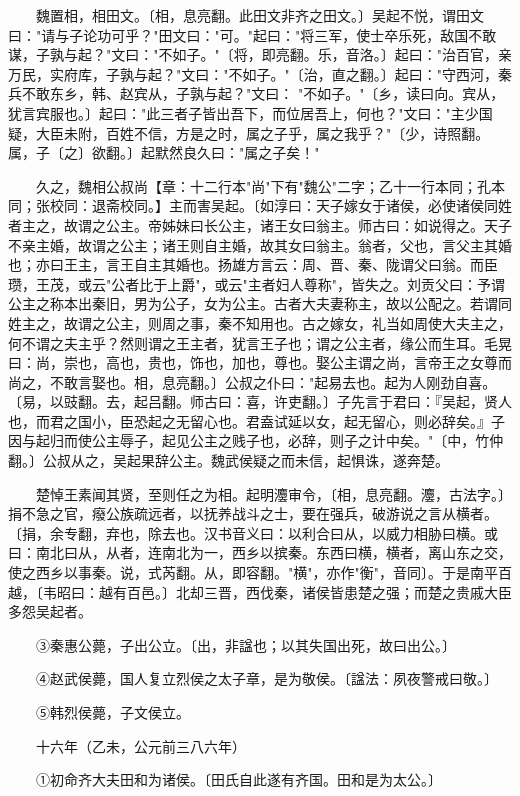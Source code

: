 　　魏置相，相田文。〔相，息亮翻。此田文非齐之田文。〕吴起不悦，谓田文曰："请与子论功可乎？"田文曰："可。"起曰："将三军，使士卒乐死，敌国不敢谋，子孰与起？"文曰："不如子。"〔将，即亮翻。乐，音洛。〕起曰："治百官，亲万民，实府库，子孰与起？"文曰："不如子。"〔治，直之翻。〕起曰："守西河，秦兵不敢东乡，韩、赵宾从，子孰与起？"文曰： "不如子。"〔乡，读曰向。宾从，犹言宾服也。〕起曰："此三者子皆出吾下，而位居吾上，何也？"文曰："主少国疑，大臣未附，百姓不信，方是之时，属之子乎，属之我乎？"〔少，诗照翻。属，子〔之〕欲翻。〕起默然良久曰："属之子矣！"

　　久之，魏相公叔尚【章：十二行本"尚"下有"魏公"二字；乙十一行本同；孔本同；张校同：退斋校同。】主而害吴起。〔如淳曰：天子嫁女于诸侯，必使诸侯同姓者主之，故谓之公主。帝姊妹曰长公主，诸王女曰翁主。师古曰：如说得之。天子不亲主婚，故谓之公主；诸王则自主婚，故其女曰翁主。翁者，父也，言父主其婚也；亦曰王主，言王自主其婚也。扬雄方言云：周、晋、秦、陇谓父曰翁。而臣瓒，王茂，或云"公者比于上爵"，或云"主者妇人尊称"，皆失之。刘贡父曰：予谓公主之称本出秦旧，男为公子，女为公主。古者大夫妻称主，故以公配之。若谓同姓主之，故谓之公主，则周之事，秦不知用也。古之嫁女，礼当如周使大夫主之，何不谓之夫主乎？然则谓之王主者，犹言王子也；谓之公主者，缘公而生耳。毛晃曰：尚，崇也，高也，贵也，饰也，加也，尊也。娶公主谓之尚，言帝王之女尊而尚之，不敢言娶也。相，息亮翻。〕公叔之仆曰："起易去也。起为人刚劲自喜。〔易，以豉翻。去，起吕翻。师古曰：喜，许吏翻。〕子先言于君曰：『吴起，贤人也，而君之国小，臣恐起之无留心也。君盍试延以女，起无留心，则必辞矣。』子因与起归而使公主辱子，起见公主之贱子也，必辞，则子之计中矣。"〔中，竹仲翻。〕公叔从之，吴起果辞公主。魏武侯疑之而未信，起惧诛，遂奔楚。

　　楚悼王素闻其贤，至则任之为相。起明灋审令，〔相，息亮翻。灋，古法字。〕捐不急之官，癈公族疏远者，以抚养战斗之士，要在强兵，破游说之言从横者。〔捐，余专翻，弃也，除去也。汉书音义曰：以利合曰从，以威力相胁曰横。或曰：南北曰从，从者，连南北为一，西乡以摈秦。东西曰横，横者，离山东之交，使之西乡以事秦。说，式芮翻。从，即容翻。"横"，亦作"衡"，音同〕。于是南平百越，〔韦昭曰：越有百邑。〕北却三晋，西伐秦，诸侯皆患楚之强；而楚之贵戚大臣多怨吴起者。

　　③秦惠公薨，子出公立。〔出，非諡也；以其失国出死，故曰出公。〕

　　④赵武侯薨，国人复立烈侯之太子章，是为敬侯。〔諡法：夙夜警戒曰敬。〕

　　⑤韩烈侯薨，子文侯立。

　　十六年（乙未，公元前三八六年）

　　①初命齐大夫田和为诸侯。〔田氏自此遂有齐国。田和是为太公。〕

